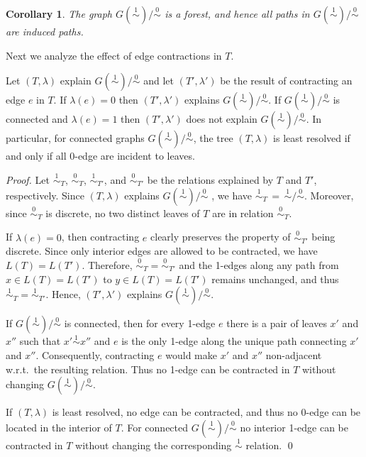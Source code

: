 \documentclass[smallextended]{svjour3}
\newcommand{\Ro}{\mathrel{\overset{0}{\sim}}}
\newcommand{\Rl}{\mathrel{\overset{1}{\sim}}}
\newtheorem{cor}[thm]{Corollary}
\begin{document}
\begin{cor}
  The graph $G(\Rl)/\Ro$ is a forest, and hence all paths in $G(\Rl)/\Ro$
  are induced paths.
  \label{cor:cycle-free}
\end{cor}

Next we analyze the effect of edge contractions in $T$.

\begin{lemma}
  Let $(T,\lambda)$ explain $G(\Rl)/\Ro$ and let $(T',\lambda')$ be the
  result of contracting an edge $e$ in $T$. If $\lambda(e)=0$ then $(T',\lambda')$
  explains $G(\Rl)/\Ro$. If $G(\Rl)/\Ro$ is connected and $\lambda(e)=1$
  then $(T',\lambda')$ does not explain $G(\Rl)/\Ro$.  In particular, for
  connected graphs $G(\Rl)/\Ro$, the tree $(T,\lambda)$ is least resolved
  if and only if all 0-edge are incident to leaves.
\end{lemma}
\begin{proof}
  Let $\Rl_T$, $\Ro_T$, $\Rl_{T'}$, and $\Ro_{T'}$ be the relations
  explained by $T$ and $T'$, respectively.  Since $(T,\lambda)$ explains
  $G(\Rl)/\Ro$ , we have $\Rl_T\,=\,\Rl/\Ro$. Moreover, since $\Ro_T$ is
  discrete, no two distinct leaves of $T$ are in relation $\Ro_T$.

  If $\lambda(e)=0$, then contracting $e$ clearly preserves the property of
  $\Ro_{T'}$ being discrete.  Since only interior edges are allowed to be
  contracted, we have $L(T)=L(T')$. Therefore, $\Ro_T =\Ro_{T'}$ and the
  1-edges along any path from $x\in L(T)=L(T')$ to $y\in L(T)=L(T')$
  remains unchanged, and thus $\Rl_T=\Rl_{T'}$.  Hence, $(T',\lambda')$
  explains $G(\Rl)/\Ro$.

  If $G(\Rl)/\Ro$ is connected, then for every 1-edge $e$ there is a pair
  of leaves $x'$ and $x''$ such that $x'\Rl x''$ and $e$ is the only 1-edge
  along the unique path connecting $x'$ and $x''$. Consequently,
  contracting $e$ would make $x'$ and $x''$ non-adjacent w.r.t.\ the
  resulting relation.  Thus no 1-edge can be contracted in $T$ without
  changing $G(\Rl)/\Ro$.

  If $(T,\lambda)$ is least resolved, no edge can be contracted, and thus
  no 0-edge can be located in the interior of $T$. For connected
  $G(\Rl)/\Ro$ no interior 1-edge can be contracted in $T$ without changing
  the corresponding $\Rl$ relation. \qed
\end{proof}
\end{document}
